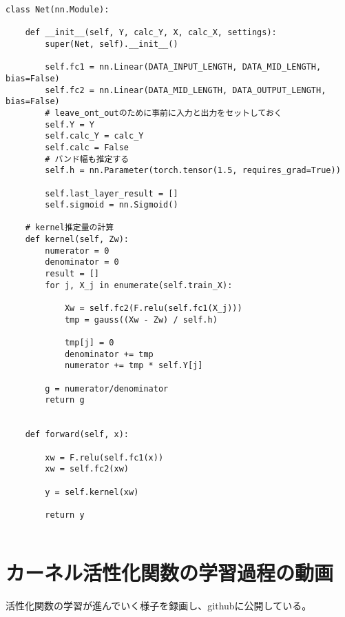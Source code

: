 \begin{lstlisting}[caption=Pytorchを用いたK-AFの計算用のクラス,label=python_impl]
class Net(nn.Module):

    def __init__(self, Y, calc_Y, X, calc_X, settings):
        super(Net, self).__init__()

        self.fc1 = nn.Linear(DATA_INPUT_LENGTH, DATA_MID_LENGTH, bias=False)
        self.fc2 = nn.Linear(DATA_MID_LENGTH, DATA_OUTPUT_LENGTH, bias=False)
        # leave_ont_outのために事前に入力と出力をセットしておく
        self.Y = Y
        self.calc_Y = calc_Y
        self.calc = False
        # バンド幅も推定する
        self.h = nn.Parameter(torch.tensor(1.5, requires_grad=True))

        self.last_layer_result = []
        self.sigmoid = nn.Sigmoid()

    # kernel推定量の計算
    def kernel(self, Zw):
        numerator = 0
        denominator = 0
        result = []
        for j, X_j in enumerate(self.train_X):

            Xw = self.fc2(F.relu(self.fc1(X_j)))
            tmp = gauss((Xw - Zw) / self.h)

            tmp[j] = 0
            denominator += tmp
            numerator += tmp * self.Y[j]

        g = numerator/denominator
        return g


    def forward(self, x):

        xw = F.relu(self.fc1(x))
        xw = self.fc2(xw)

        y = self.kernel(xw)

        return y


\end{lstlisting}


\chapter{カーネル活性化関数の学習過程の動画}
\label{appendix:movie}

活性化関数の学習が進んでいく様子を録画し、githubに公開している。



